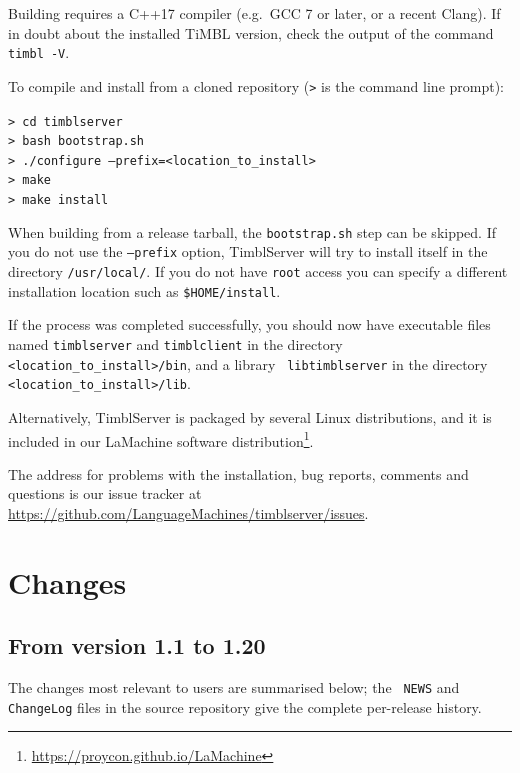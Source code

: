 \documentclass{report}
\begin{document}
Building requires a C++17 compiler (e.g.\ GCC 7 or later, or a recent
Clang). If in doubt about the installed TiMBL version, check the
output of the command {\tt timbl -V}.

To compile and install from a cloned repository ({\tt >} is the
command line prompt):

{\tt > cd timblserver} \\
{\tt > bash bootstrap.sh} \\
{\tt > ./configure --prefix=<location\_to\_install>} \\
{\tt > make} \\
{\tt > make install}

When building from a release tarball, the {\tt bootstrap.sh} step can
be skipped. If you do not use the {\tt --prefix} option, TimblServer
will try to install itself in the directory {\tt /usr/local/}. If you
do not have {\tt root} access you can specify a different installation
location such as {\tt \$HOME/install}.

If the process was completed successfully, you should now have
executable files named {\tt timblserver} and {\tt timblclient} in the
directory {\tt <location\_to\_install>/bin}, and a library {\tt
  libtimblserver} in the directory {\tt <location\_to\_install>/lib}.

Alternatively, TimblServer is packaged by several Linux distributions,
and it is included in our LaMachine software
distribution\footnote{\url{https://proycon.github.io/LaMachine}}.

The address for problems with the installation, bug reports, comments
and questions is our issue tracker at
\url{https://github.com/LanguageMachines/timblserver/issues}.

\chapter{Changes}
\label{changes}

\section{From version 1.1 to 1.20}

The changes most relevant to users are summarised below; the {\tt
  NEWS} and {\tt ChangeLog} files in the source repository give the
complete per-release history.
\end{document}
